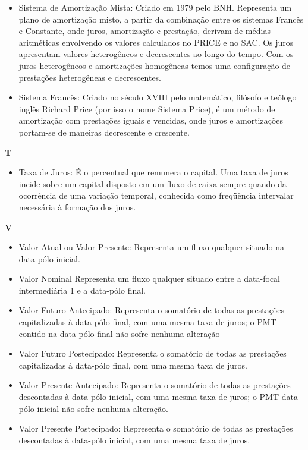 \begin{itemize}
\item Sistema de Amortização Mista:
    Criado em 1979 pelo BNH. Representa um plano de amortização misto, a partir da combinação entre os sistemas Francês e Constante, onde juros, amortização e prestação, derivam de médias aritméticas envolvendo os valores calculados no PRICE e no SAC. Os juros apresentam valores heterogêneos e decrescentes ao longo do tempo. Com os juros heterogêneos e amortizações homogêneas temos uma configuração de prestações heterogêneas e decrescentes. 

\item Sistema Francês:
    Criado no século XVIII pelo matemático, filósofo e teólogo inglês Richard Price (por isso o nome Sistema Price), é um método de amortização com prestações iguais e vencidas, onde juros e amortizações portam-se de maneiras decrescente e crescente. 
\end{itemize}

\textbf{T}
\begin{itemize}
\item Taxa de Juros:
    É o percentual que remunera o capital. Uma taxa de juros incide sobre um capital disposto em um fluxo de caixa sempre quando da ocorrência de uma variação temporal, conhecida como freqüência intervalar necessária à formação dos juros. 
\end{itemize}

\textbf{V}
\begin{itemize}
 \item Valor Atual ou Valor Presente:
    Representa um fluxo qualquer situado na data-pólo inicial. 

\item Valor Nominal
    Representa um fluxo qualquer situado entre a data-focal intermediária 1 e a data-pólo final. 

\item Valor Futuro Antecipado:
    Representa o somatório de todas as prestações capitalizadas à data-pólo final, com uma mesma taxa de juros; o PMT contido na data-pólo final não sofre nenhuma alteração 

\item Valor Futuro Postecipado:
    Representa o somatório de todas as prestações capitalizadas à data-pólo final, 
com uma mesma taxa de juros.

\item Valor Presente Antecipado:
    Representa o somatório de todas as prestações descontadas à data-pólo inicial, com uma mesma taxa de juros; o PMT data-pólo inicial não sofre nenhuma alteração. 

\item Valor Presente Postecipado:
    Representa o somatório de todas as prestações descontadas à data-pólo inicial, com uma mesma taxa de juros. 
\end{itemize}